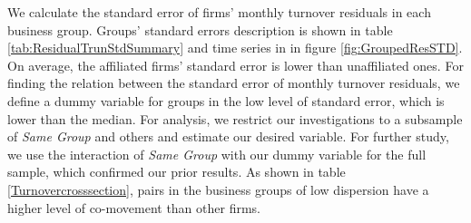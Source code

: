 We calculate the standard error of firms' monthly turnover residuals in each business group. Groups' standard errors description is shown in table \ref{tab:ResidualTrunStdSummary} and time series in in figure \ref{fig:GroupedResSTD}. On average, the affiliated firms' standard error is lower than unaffiliated ones. For finding the relation between the standard error of monthly turnover residuals, we define a dummy variable for groups in the low level of standard error, which is lower than the median. For analysis, we restrict our investigations to a subsample of \textit{Same Group} and others and estimate our desired variable.   For further study, we use the interaction of \textit{Same Group} with our dummy variable for the full sample, which confirmed our prior results. As shown in table \ref{Turnovercrosssection}, pairs in the business groups of low dispersion have a higher level of co-movement than other firms.



